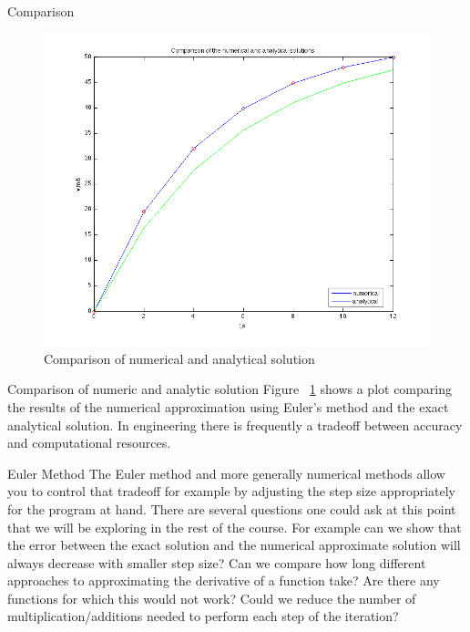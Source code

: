 \documentclass[12pt]{beamer}
\begin{document}
\begin{frame}{Comparison}
\begin{figure}[ht]
  \centering
  \includegraphics[scale=0.35]{comparison_numerical_analytical}
  \caption{Comparison of numerical and analytical solution}
  \label{fig:comparison}
\end{figure}





\end{frame}


\begin{frame}{Comparison of numeric and analytic solution}
Figure ~\ref{fig:comparison} shows a plot comparing the results of the
numerical approximation using Euler's method and the exact analytical
solution. In engineering there is frequently a tradeoff between
accuracy and computational resources. 
\end{frame} 

\begin{frame}{Euler Method} 
The Euler method and more generally numerical methods allow you to
control that tradeoff for example by adjusting the step size
appropriately for the program at hand. There are several questions one
could ask at this point that we will be exploring in the rest of the
course. For example can we show that the error between the exact
solution and the numerical approximate solution will always decrease
with smaller step size? Can we compare how long different approaches
to approximating the derivative of a function take? Are there any
functions for which this would not work? Could we reduce the number
of multiplication/additions needed to perform each step of the
iteration?

\end{frame}
\end{document}
